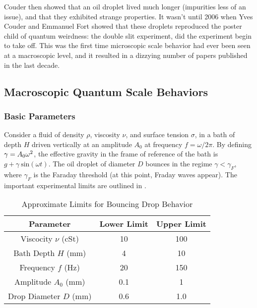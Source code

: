 	        

	    
	    Couder then showed that an oil droplet lived much longer (impurities less of an issue), and that they exhibited strange properties. It wasn't until 2006 when Yves Couder and Emmanuel Fort showed that these droplets reproduced the poster child of quantum weirdness: the double slit experiment, did the experiment begin to take off. This was the first time microscopic scale behavior had ever been seen at a macroscopic level, and it resulted in a dizzying number of papers published in the last decade. 
	    
	    \subsection{Macroscopic Quantum Scale Behaviors} 
	    \subsubsection{Basic Parameters}
	       Consider a fluid of density $\rho$, viscosity $\nu$, and surface tension $\sigma$, in a bath of depth $H$ driven vertically at an amplitude $A_0$ at frequency $f=\omega/{2\pi}$. By defining $\mathnormal{\gamma}=A_0\omega^2$, the effective gravity in the frame of reference of the bath is $g+\gamma~\mathrm{sin}(\omega t)$. The oil droplet of diameter $D$ bounces in the regime $\gamma<\gamma_F$, where $\gamma_F$ is the Faraday threshold (at this point, Fraday waves appear). The important experimental limits are outlined in . 
	       \begin{table}[htdp] 
\caption[Basic Table 1]{Approximate Limits for Bouncing Drop Behavior} 
\begin{center} 
\begin{tabular}{c c c} 
\toprule 
  Parameter &  Lower Limit & Upper Limit \\
  \midrule
Viscocity $\nu$ (cSt) & 10 & 100 \\ 
Bath Depth $H$ (mm) & 4 & 10 \\
Frequency $f$ (Hz) & 20 & 150 \\
Amplitude $A_0$ (mm) & 0.1 & 1 \\
Drop Diameter $D$ (mm) & 0.6 & 1.0 \\
\bottomrule 
\end{tabular}
\end{center}
\label{approxlimits} 
\end{table}	

